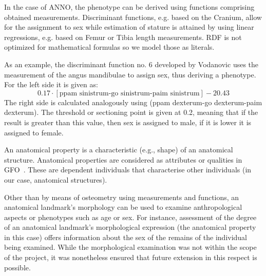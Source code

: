 \documentclass[sw]{iosart2x}
\begin{document}
In the case of ANNO, the phenotype can be derived using functions comprising obtained measurements.
Discriminant functions, e.g. based on the Cranium, allow for the assignment to sex while estimation of stature is attained by using linear regressions, e.g. based on Femur or Tibia length measurements.
RDF is not optimized for mathematical formulas so we model those as literals.

As an example, the discriminant function no. 6 developed by Vodanovic uses the measurement of the angus mandibulae to assign sex, thus deriving a phenotype.
For the left side it is given as:
\[
0.17 \cdot [\text{ppam sinistrum-go sinistrum-paim sinistrum}] - 20.43
\]
The right side is calculated analogously using (ppam dexterum-go dexterum-paim dexterum).
The threshold or sectioning point is given at 0.2, meaning that if the result is greater than this value, then sex is assigned to male, if it is lower it is assigned to female.

An anatomical property is a characteristic (e.g., shape) of an anatomical structure.
Anatomical properties are considered as attributes or qualities in GFO~\citep{gfoarchitecture}.
These are dependent individuals that characterise other individuals (in our case, anatomical structures).

Other than by means of osteometry using measurements and functions, an anatomical landmark's morphology can be used to examine anthropological aspects or phenotypes such as age or sex.
For instance, assessment of the degree of an anatomical landmark's morphological expression (the anatomical property in this case) offers information about the sex of the remains of the individual being examined.
While the morphological examination was not within the scope of the project, it was nonetheless ensured that future extension in this respect is possible.
\end{document}
